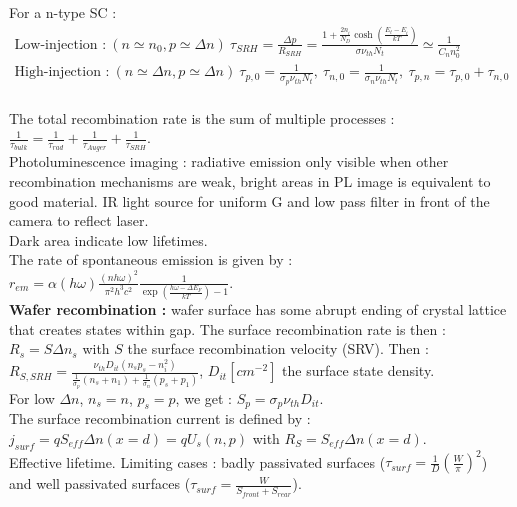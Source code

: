 \documentclass[../main.tex]{subfiles}
\begin{document}
For a n-type SC : \begin{equation}
    \begin{gathered}
        \text{Low-injection :}\: (n\simeq n_0, p\simeq \Delta n)\: \tau_{SRH} = \frac{\Delta p}{R_{SRH}} = \frac{1+\frac{2n_i}{N_D} \cosh(\frac{E_t-E_i}{kT})}{\sigma \nu_{th} N_t} \simeq \frac{1}{C_n n_0^2}\\
        \text{High-injection :}\: (n\simeq \Delta n, p\simeq \Delta n)\: \tau_{p,0} = \frac{1}{\sigma_p \nu_{th} N_t}, \: \tau_{n,0} = \frac{1}{\sigma_n \nu_{th}N_t}, \: \tau_{p,n} = \tau_{p,0} + \tau_{n,0}\\
    \end{gathered}
\end{equation}

The total recombination rate is the sum of multiple processes : $\frac{1}{\tau_{bulk}} = \frac{1}{\tau_{rad}} + \frac{1}{\tau_{Auger}} + \frac{1}{\tau_{SRH}}$.\\


Photoluminescence imaging : radiative emission only visible when other recombination mechanisms are weak, bright areas in PL image is equivalent to good material. IR light source for uniform G and low pass filter in front of the camera to reflect laser.\\
Dark area indicate low lifetimes.\\
The rate of spontaneous emission is given by : $r_{em} = \alpha(h\omega) \frac{(nh\omega)^2}{\pi^2 h^3 c^2} \frac{1}{\exp(\frac{h\omega-\Delta E_F}{kT})-1}$.\\


\textbf{Wafer recombination :} wafer surface has some abrupt ending of crystal lattice that creates states within gap. The surface recombination rate is then : $R_s = S \Delta n_s$ with $S$ the surface recombination velocity (SRV). Then : $R_{S,SRH} = \frac{\nu_{th} D_{it} (n_sp_s-n_i^2)}{\frac{1}{\sigma_p} (n_s+n_1) + \frac{1}{\sigma_n} (p_s+p_1)}$, $D_{it} [cm^{-2}]$ the surface state density.\\
For low $\Delta n$, $n_s=n$, $p_s=p$, we get : $S_p = \sigma_p \nu_{th} D_{it}$.\\
The surface recombination current is defined by : $j_{surf} = q S_{eff} \Delta n(x=d) = qU_s(n,p)$ with $R_S = S_{eff} \Delta n(x=d)$.\\
Effective lifetime. Limiting cases : badly passivated surfaces ($\tau_{surf} = \frac{1}{D} (\frac{W}{\pi})^2$) and well passivated surfaces ($\tau_{surf} = \frac{W}{S_{front} + S_{rear}}$).\\
\end{document}
